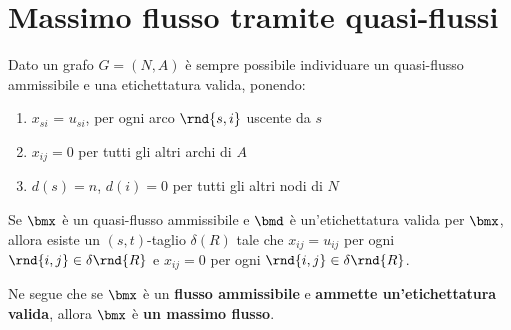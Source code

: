\documentclass[\main/main.tex]{subfiles}
\begin{document}
\section{Massimo flusso tramite quasi-flussi}
Dato un grafo \(G = (N, A)\) è sempre possibile individuare un quasi-flusso ammissibile e una etichettatura valida, ponendo:

\begin{enumerate}
  \item \(x_{si}\) = \(u_{si}\), per ogni arco \(\rnd{s,i}\) uscente da \(s\)
  \item \(x_{ij} = 0\) per tutti gli altri archi di \(A\)
  \item \(d(s) = n\), \(d(i) = 0\) per tutti gli altri nodi di \(N\)
\end{enumerate}

\begin{theorem}
  Se \(\bmx\) è un quasi-flusso ammissibile e \(\bmd\) è un'etichettatura valida per \(\bmx\), allora esiste un \((s,t)\)-taglio \(\delta(R)\) tale che \(x_{ij}=u_{ij}\) per ogni \(\rnd{i,j}\in \delta\rnd{R}\) e \(x_{ij}=0\) per ogni \(\rnd{i,j} \in \delta\rnd{R}\).

  Ne segue che se \(\bmx\) è un \textbf{flusso ammissibile} e \textbf{ammette un'etichettatura valida}, allora \(\bmx\) è \textbf{un massimo flusso}.
\end{theorem}
\end{document}
